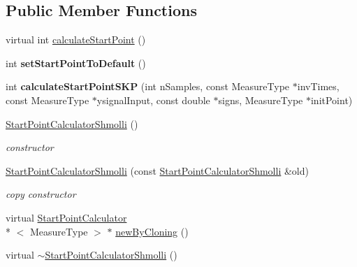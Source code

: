 \subsection*{Public Member Functions}
\begin{DoxyCompactItemize}
\item 
virtual int \hyperlink{class_ox_1_1_start_point_calculator_shmolli_acd0913906ed0d4301b78b5329cc3d62f}{calculate\-Start\-Point} ()
\item 
\hypertarget{class_ox_1_1_start_point_calculator_shmolli_ac4e1b932329096fd43f77c4ddf2bd804}{int {\bfseries set\-Start\-Point\-To\-Default} ()}\label{class_ox_1_1_start_point_calculator_shmolli_ac4e1b932329096fd43f77c4ddf2bd804}

\item 
\hypertarget{class_ox_1_1_start_point_calculator_shmolli_aaf776712e300b190928e793eec54cc47}{int {\bfseries calculate\-Start\-Point\-S\-K\-P} (int n\-Samples, const Measure\-Type $\ast$inv\-Times, const Measure\-Type $\ast$ysignal\-Input, const double $\ast$signs, Measure\-Type $\ast$init\-Point)}\label{class_ox_1_1_start_point_calculator_shmolli_aaf776712e300b190928e793eec54cc47}

\item 
\hypertarget{class_ox_1_1_start_point_calculator_shmolli_afc823088ce6d5d0ac3e1eec161ede9e2}{\hyperlink{class_ox_1_1_start_point_calculator_shmolli_afc823088ce6d5d0ac3e1eec161ede9e2}{Start\-Point\-Calculator\-Shmolli} ()}\label{class_ox_1_1_start_point_calculator_shmolli_afc823088ce6d5d0ac3e1eec161ede9e2}

\begin{DoxyCompactList}\small\item\em constructor \end{DoxyCompactList}\item 
\hypertarget{class_ox_1_1_start_point_calculator_shmolli_a65b9fc02c5e9483e9b3b39ee0962e201}{\hyperlink{class_ox_1_1_start_point_calculator_shmolli_a65b9fc02c5e9483e9b3b39ee0962e201}{Start\-Point\-Calculator\-Shmolli} (const \hyperlink{class_ox_1_1_start_point_calculator_shmolli}{Start\-Point\-Calculator\-Shmolli} \&old)}\label{class_ox_1_1_start_point_calculator_shmolli_a65b9fc02c5e9483e9b3b39ee0962e201}

\begin{DoxyCompactList}\small\item\em copy constructor \end{DoxyCompactList}\item 
virtual \hyperlink{class_ox_1_1_start_point_calculator}{Start\-Point\-Calculator}\\*
$<$ Measure\-Type $>$ $\ast$ \hyperlink{class_ox_1_1_start_point_calculator_shmolli_ab3f7f6efa7fb6ac4ce1a93fb7ec42f85}{new\-By\-Cloning} ()
\item 
\hypertarget{class_ox_1_1_start_point_calculator_shmolli_aaede509b017e5da6102a230ad979539a}{virtual \hyperlink{class_ox_1_1_start_point_calculator_shmolli_aaede509b017e5da6102a230ad979539a}{$\sim$\-Start\-Point\-Calculator\-Shmolli} ()}\label{class_ox_1_1_start_point_calculator_shmolli_aaede509b017e5da6102a230ad979539a}


\end{DoxyCompactItemize}
